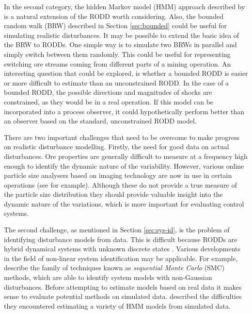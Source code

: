 In the second category, the hidden Markov model (\gls{HMM}) approach described by \cite{wong_realistic_2009} is a natural extension of the \gls{RODD} worth considering. Also, the bounded random walk (\gls{BRW}) described in Section \ref{sec:bounded} could be useful for simulating realistic disturbances. It may be possible to extend the basic idea of the \gls{BRW} to \gls{RODD}s. One simple way is to simulate two \gls{BRW}s in parallel and simply switch between them randomly. This could be useful for representing switching ore streams coming from different parts of a mining operation. An interesting question that could be explored, is whether a bounded \gls{RODD} is easier or more difficult to estimate than an unconstrained \gls{RODD}. In the case of a bounded \gls{RODD}, the possible directions and magnitudes of shocks are constrained, as they would be in a real operation. If this model can be incorporated into a process observer, it could hypothetically perform better than an observer based on the standard, unconstrained \gls{RODD} model.

There are two important challenges that need to be overcome to make progress on realistic disturbance modelling. Firstly, the need for good data on actual disturbances. Ore properties are generally difficult to measure at a frequency high enough to identify the dynamic nature of the variability. However, various online particle size analysers based on imaging technology are now in use in certain operations (see \cite{steyn_investigating_2018} for example). Although these do not provide a true measure of the particle size distribution they should provide valuable insight into the dynamic nature of the variations, which is more important for evaluating control systems. 

The second challenge, as mentioned in Section \ref{sec:sys-id}, is the problem of identifying disturbance models from data. This is difficult because \gls{RODD}s are hybrid dynamical systems with unknown discrete states \citep{sworder_boyd_1999}. Various developments in the field of non-linear system identification may be applicable. For example, \cite{schon_sequential_2015} describe the family of techniques known as \textit{sequential Monte Carlo} (\gls{SMC}) methods, which are able to identify system models with non-Gaussian disturbances. Before attempting to estimate models based on real data it makes sense to evaluate potential methods on simulated data. \cite{wong_realistic_2009} described the difficulties they encountered estimating a variety of \gls{HMM} models from simulated data.

